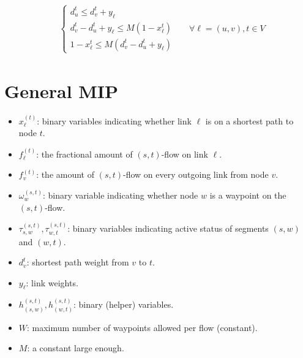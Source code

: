 \documentclass[a4paper,USenglish]{lipics-v2018}
\begin{document}
\begin{align}
\label{LP:equalSplit} 
\\ 
&\begin{cases*}
d^{t}_u \leq d^{t}_v + y_{\ell} \\
d^{t}_v - d^{t}_u + y_{\ell} \leq M(1 - x^t_{\ell})	\\
1 - x^t_{\ell} \leq M(d^{t}_v - d^{t}_u + y_{\ell})
\end{cases*}
&& \forall \ell = (u,v),  t \in V
\label{LP:weights} 
\end{align}


\section{General MIP}
\begin{itemize}
\item	
	$x^{(t)}_{\ell}$:	binary variables indicating whether link $\ell$ is on a shortest path to node $t$.
\item	
	$f^{(t)}_{\ell}$: the fractional amount of $(s,t)$-flow on link $\ell$.
\item	
	$f^{(t)}_{v}$:  the amount of $(s,t)$-flow on every outgoing link from node $v$.
\item
	$\omega^{(s,t)}_{w}$: binary variable indicating whether node $w$ is a waypoint on the $(s,t)$-flow. 
\item $\tau^{(s,t)}_{s,w}, \tau^{(s,t)}_{w,t}$: binary variables indicating active status of segments $(s,w)$ and $(w,t)$.
\item
	$d^{t}_v$: shortest path weight from $v$ to $t$.
\item	
	$y_{\ell}$: link weights.
\item	
	$h^{(s,t)}_{(s,w)}, h^{(s,t)}_{(w,t)}$: binary (helper) variables.
\item
	$W$: maximum  number of waypoints allowed per flow (constant).
\item
	$M$: a constant large enough.	
\end{itemize}
\end{document}
